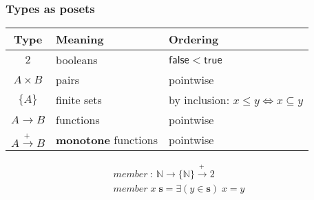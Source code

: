 \documentclass{beamer}
\newcommand{\mto}{\overset{+\:}{\to}}
\newcommand{\ms}{\mathsf}
\begin{document}
\begin{frame}
  \frametitle{Types as posets}
  \begin{center}
    \begin{tabular}{cll}
      \textbf{Type} & \textbf{Meaning} & \textbf{Ordering}
      \\\hline
      $2$ & booleans & $\ms{false} < \ms{true}$\\
      $A \times B$ & pairs & pointwise\\
      $\{A\}$      & finite sets & by inclusion: $x \le y \iff x \subseteq y$\\
      $A \to B$    & functions & pointwise\\
      $A \mto B$  & \textbf{monotone} functions & pointwise\\
    \end{tabular}
  \end{center}

  \vspace{0.75em}\pause

  \[\begin{array}{l}
    member ~:~ \mathbb{N} \to \{\mathbb{N}\} \mto 2\\
    member\; x\; \mathbf{s} = \exists(y \in \mathbf{s})\; x = y
  \end{array}\]

  \vspace{5em}

\end{frame}
\end{document}
